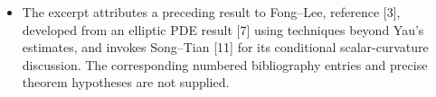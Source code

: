\documentclass[11pt]{article}
\begin{document}
\begin{itemize}
\item The excerpt attributes a preceding result to Fong--Lee, reference [3], developed from an elliptic PDE result [7] using techniques beyond Yau's estimates, and invokes Song--Tian [11] for its conditional scalar-curvature discussion. The corresponding numbered bibliography entries and precise theorem hypotheses are not supplied.
\end{itemize}
\end{document}
